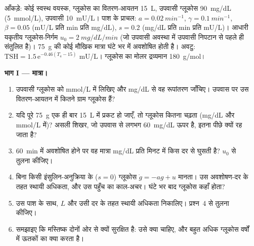 \begin{problem}
\label{pb:b3:endocrinology:1}
आँकड़े: कोई स्वस्थ वयस्क, ग्लूकोस का वितरण-आयतन \qty{15}{L}, उपवासी
ग्लूकोस \qty{90}{mg/dL} (\qty{5}{mmol/L}), उपवासी 
\qty{10}{mU/L}। पाश के प्राचल: $a = \qty{0.02}{min^{-1}}$, $\gamma =
\qty{0.1}{min^{-1}}$, $\beta = 0.05$ (mU/L प्रति min प्रति mg/dL),
$s = 0.2$ (mg/dL प्रति min प्रति mU/L)। आधारी यकृतीय ग्लूकोस-निर्गम $u_{0} =
\qty{2}{mg/dL/min}$ (जो उपवासी अवस्था में उपवासी निपटान से
पहले ही संतुलित है)। \qty{75}{g} की कोई मौखिक मात्रा घंटे भर में
अवशोषित होती है। अवटु: $\text{TSH} = 1.5\,\mathrm{e}^{-0.46(T_{4} - 15)}$
mU/L। ग्लूकोस का मोलर द्रव्यमान \qty{180}{g/mol}।

\medskip
\noindent\textbf{भाग I --- मात्रा।}
\begin{enumerate}
  \item उपवासी ग्लूकोस को mmol/L में लिखिए और mg/dL से वह रूपांतरण
        जाँचिए। उपवास पर उस वितरण-आयतन में कितने ग्राम ग्लूकोस हैं?
  \item यदि पूरे \qty{75}{g} एक ही बार \qty{15}{L} में प्रकट हो जाएँ,
        तो ग्लूकोस कितना चढ़ता (mg/dL और mmol/L में)? असली शिखर, जो
        उपवास से लगभग \qty{60}{mg/dL} ऊपर है, इतना पीछे क्यों रह जाता
        है?
  \item \qty{60}{min} में अवशोषित होने पर वह मात्रा mg/dL प्रति मिनट
        में किस दर से घुसती है? $u_{0}$ से तुलना कीजिए।
  \item बिना किसी इंसुलिन-अनुक्रिया के ($s = 0$) ग्लूकोस $\dot
        g = -a g + u$ मानता। उस अवशोषण-दर के तहत स्थायी अधिकता, और उस
        पहुँच का काल-अचर। घंटे भर बाद ग्लूकोस कहाँ होता?
  \item उस पाश के साथ, $L$ और उसी दर के तहत स्थायी अधिकता निकालिए।
        प्रश्न~4 से तुलना कीजिए।
  \item समझाइए कि मस्तिष्क दोनों ओर से क्यों सुरक्षित है: उसे क्या
        चाहिए, और बहुत अधिक ग्लूकोस वर्षों में ऊतकों का क्या करता है।
\end{enumerate}


\end{problem}
